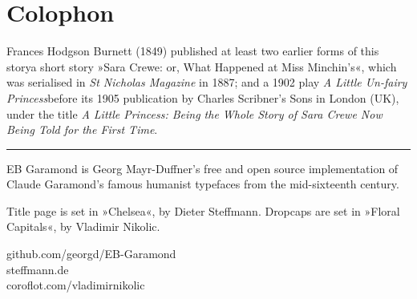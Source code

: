 \documentclass[
paper=5.5in:8.5in,
]{scrbook}
\begin{document}
\frontmatter


 


\pagestyle{plain}



\tableofcontents
\clearpage




\renewcommand*{\chapterpagestyle}{plain}

%
%





 
 \mainmatter
  \renewcommand*{\chapterheadstartvskip}{\vspace{0pt}}
 \pagestyle{headings}
























{}
\chapter*{Colophon}

\centering
\begin{minipage}{\textwidth}
Frances Hodgson Burnett (1849) published at least two earlier forms of this story\textemdash a short story »Sara Crewe: or, What Happened at Miss Minchin's«, which was serialised in \textit{St Nicholas Magazine} in 1887; and a 1902 play \textit{A Little Un-fairy Princess}\textemdash before its 1905 publication by Charles Scribner's Sons in London (UK), under the title \textit{A Little Princess: Being the Whole Story of Sara Crewe Now Being Told for the First Time}.
\end{minipage}
\vfill
\rule{0.5\textwidth}{.4pt}
\vfill
\begin{minipage}{\textwidth}
EB Garamond is Georg Mayr-Duffner's free and open source implementation of Claude Garamond’s famous humanist typefaces from the mid-sixteenth century. 
\end{minipage}
\vfill
\begin{minipage}{\textwidth}
Title page is set in »Chelsea«, by Dieter Steffmann. Dropcaps are set in »Floral Capitals«, by Vladimir Nikolic.
\end{minipage}
\vfill
github.com/georgd/EB-Garamond\\
steffmann.de\\
coroflot.com/vladimirnikolic
\end{document}
